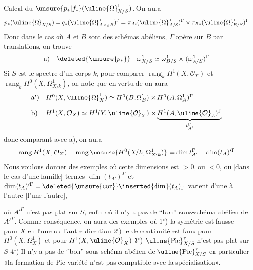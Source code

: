Calcul du $\unsure{p_*|f_*}(\uline{\Omega}^1_{X/S})$. On aura
\[
p_*(\uline{\Omega}^1_{X/S})=q_*(\uline{\Omega}^1_{A\times_S B})^{\Gamma}=\pi_{A*}(\uline{\Omega}^1_{A/S})^{\Gamma}\times\pi_{B*}(\uline{\Omega}^1_{B/S})^{\Gamma}
\]
Donc dans le cas  où $A$ et $B$ sont des schémas abéliens,  $\Gamma$ opère sur $B$ par translations, on trouve
\[
\text{a)}\quad\deleted{\unsure{p_*}}\quad\omega^1_{X/S}\simeq\omega^1_{B/S}\times(\omega^1_{A/S})^{\Gamma}
\]
Si $S$ est le spectre d'un corps $k$, pour comparer $\operatorname{rang}_k H^1(X,\mathcal O_X)$ et $\operatorname{rang}_k H^0(X,\Omega^1_{X/k})$, on note  que en vertu de \unsure{$(*)$} on aura
\[
\begin{array}{ll}
\text{a')} &H^0(X,\uline{\Omega}^1_X)\simeq H^0(B,\Omega^1_B)\times H^0(A,\Omega^1_A)^{\Gamma}\\[1em]
\text{b)} &H^1(X,\mathcal O_X)\simeq H^1(Y,\uline{\mathcal O}_Y)\times\underbrace{H^1(A,\uline{\mathcal O}_A)^{\Gamma}}_{t_{A'}^{\Gamma}}
\end{array}
\]
donc comparant avec a), on aura
\[
\operatorname{rang}H^1(X,\mathcal O_X)-\operatorname{rang}\unsure{H^0(X/k,\Omega^1_{X/k})}=\dim t_{A'}^{\Gamma}-\dim(t_A)'^{\Gamma}
\]
Nous voulons donner des exemples où cette  dimensions est $>0$, ou $<0$,  ou [dans le cas d'une famille]  termes  $\dim(t_{A'})^{\Gamma}$ et $\dim(t_A)'^{\Gamma}=\deleted{\unsure{\operatorname{cor}}}\inserted{\dim}(t_A)_{\Gamma}$ varient d'une  à l'autre \deleted{[\unsure{par un}} [l'une  l'autre],

où $A'^{\Gamma}$ n'est pas plat sur $S$, enfin où il n'y a pas de ``bon'' sous-schéma abélien de $A'^{\Gamma}$. Comme conséquence, on aura des exemples où 1$^\circ$) la symétrie est fausse pour $X$ en l'une ou l'autre direction 2$^\circ$) le  de continuité est faux pour $H^0(X,\Omega^1_X)$ et pour $H^1(X,\uline{\mathcal O}_X)$ 3$^\circ$) $\uline{\operatorname{Pic}}_{X/S}^{\tau}$ n'est pas plat sur $S$ 4$^\circ$) Il n'y a pas de ``bon'' sous-schéma abélien de $\uline{\operatorname{Pic}}_{X/S}^{\tau}$ en particulier «la formation de Pic variété n'est pas compatible avec la spécialisation».

